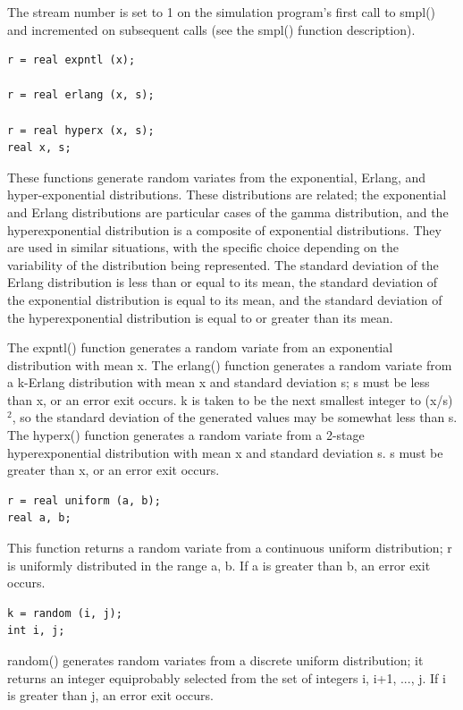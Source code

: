 The stream number is set to 1 on the simulation program's first call to
smpl() and incremented on subsequent calls (see the smpl() function
description).

\begin{verbatim}
r = real expntl (x);

r = real erlang (x, s);

r = real hyperx (x, s);
real x, s;
\end{verbatim}

These functions generate random variates from the exponential, Erlang, and
hyper-exponential distributions. These distributions are related; the
exponential and Erlang distributions are particular cases of the gamma
distribution, and the hyperexponential distribution is a composite of
exponential distributions. They are used in similar situations, with the
specific choice depending on the variability of the distribution being
represented. The standard deviation of the Erlang distribution is less than or
equal to its mean, the standard deviation of the exponential distribution is
equal to its mean, and the standard deviation of the hyperexponential
distribution is equal to or greater than its mean.

The expntl() function generates a random variate from an exponential
distribution with mean x. The erlang() function generates a random variate
from a k-Erlang distribution with mean x and standard deviation s; s must be
less than x, or an error exit occurs. k is taken to be the next smallest
integer to (x/s)$^2$, so the standard deviation of the generated values may be
somewhat less than s. The hyperx() function generates a random variate from a
2-stage hyperexponential distribution with mean x and standard deviation s. s
must be greater than x, or an error exit occurs.

\begin{verbatim}
r = real uniform (a, b);
real a, b;
\end{verbatim}

This function returns a random variate from a continuous uniform
distribution; r is uniformly distributed in the range a, b. If a is greater than
b, an error exit occurs.

\begin{verbatim}
k = random (i, j);
int i, j;
\end{verbatim}

random() generates random variates from a discrete uniform distribution; it
returns an integer equiprobably selected from the set of integers i, i+1,
..., j. If i is greater than j, an error exit occurs.

